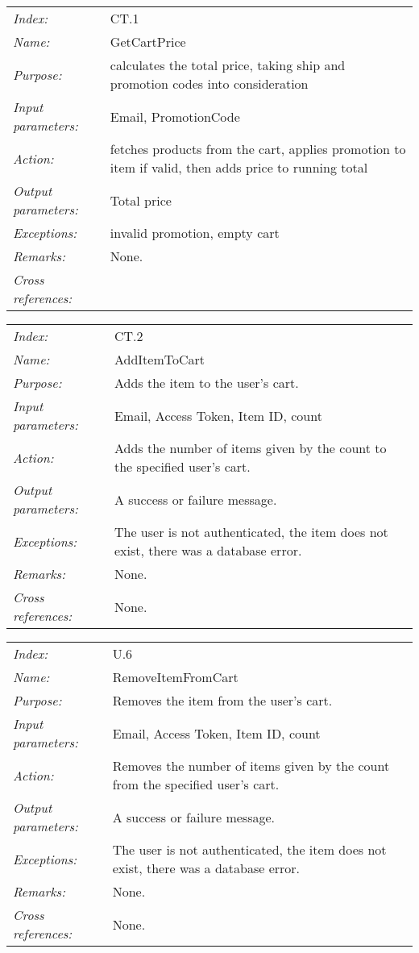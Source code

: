 \documentclass[10pt,letter]{article}
\begin{document}
\begin{tabularx}{\textwidth}{l X}
    \it{Index:} & CT.1 \\
    \it{Name:} & GetCartPrice \\
    \it{Purpose:} & calculates the total price, taking ship and promotion codes into consideration \\
    \it{Input parameters:} & Email, PromotionCode \\
    \it{Action:} &  fetches products from the cart, applies promotion to item if valid, then adds price to running total\\
    \it{Output parameters:} & Total price  \\
    \it{Exceptions:} &  invalid promotion, empty cart\\
    \it{Remarks:} & None. \\
    \it{Cross references:} & \\
    \hline
\end{tabularx}


\begin{tabularx}{\textwidth}{l X}
    \it{Index:} & CT.2 \\
    \it{Name:} & AddItemToCart \\
    \it{Purpose:} & Adds the item to the user's cart. \\
    \it{Input parameters:} & Email, Access Token, Item ID, count \\
    \it{Action:} & Adds the number of items given by the count to the specified user's cart. \\
    \it{Output parameters:} & A success or failure message. \\
    \it{Exceptions:} & The user is not authenticated, the item does not exist, there was a database error. \\
    \it{Remarks:} & None. \\
    \it{Cross references:} & None. \\
    \hline
\end{tabularx}

\begin{tabularx}{\textwidth}{l X}
    \it{Index:} & U.6 \\
    \it{Name:} & RemoveItemFromCart \\
    \it{Purpose:} & Removes the item from the user's cart. \\
    \it{Input parameters:} & Email, Access Token, Item ID, count \\
    \it{Action:} & Removes the number of items given by the count from the specified user's cart. \\
    \it{Output parameters:} & A success or failure message. \\
    \it{Exceptions:} & The user is not authenticated, the item does not exist, there was a database error. \\
    \it{Remarks:} & None. \\
    \it{Cross references:} & None. \\
    \hline
\end{tabularx}
\end{document}
